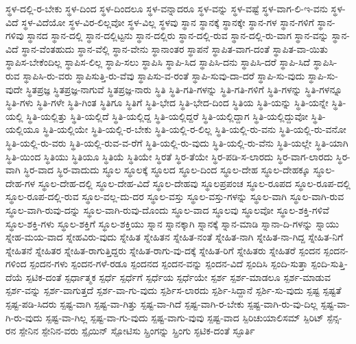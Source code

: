 {ಸ್ಥಳ-ದಲ್ಲಿ-ರ-ಬೇಕು
ಸ್ಥಳ-ದಿಂದ
ಸ್ಥಳ-ದಿಂದಲೂ
ಸ್ಥಳ-ವನ್ನಾದರೂ
ಸ್ಥಳ-ವನ್ನು
ಸ್ಥಳ-ವಷ್ಟೆ
ಸ್ಥಳ-ವಾಗ-ಲಿ-ಇ-ವನು
ಸ್ಥಳ-ವಿದೆ
ಸ್ಥಳ-ವಿದೆಯೋ
ಸ್ಥಳ-ವಿರ-ಲಿಲ್ಲವೋ
ಸ್ಥಳ-ವಿಲ್ಲ
ಸ್ಥಳವು
ಸ್ಥಾನ
ಸ್ಥಾನಕ್ಕೆ
ಸ್ಥಾನಕ್ಕೇ
ಸ್ಥಾನ-ಗಳ
ಸ್ಥಾನ-ಗಳಿಗೆ
ಸ್ಥಾನ-ಗಳಿವು
ಸ್ಥಾನದ
ಸ್ಥಾನ-ದಲ್ಲಿ
ಸ್ಥಾನ-ದಲ್ಲಿಟ್ಟನು
ಸ್ಥಾನ-ದಲ್ಲಿರು
ಸ್ಥಾನ-ದಲ್ಲಿ-ರುವ
ಸ್ಥಾನ-ದಲ್ಲಿ-ರು-ವಾಗ
ಸ್ಥಾನ-ವನ್ನು
ಸ್ಥಾನ-ವಿದೆ
ಸ್ಥಾನ-ವೆಂತಹುದು
ಸ್ಥಾನ-ವೆಲ್ಲಿ
ಸ್ಥಾನ-ವೇನು
ಸ್ಥಾನಾಂತರ
ಸ್ಥಾಪನೆ
ಸ್ಥಾಪಿತ-ವಾಗ-ದಂತೆ
ಸ್ಥಾಪಿತ-ವಾ-ಯಿತು
ಸ್ಥಾಪಿಸ-ಬೇಕೆಂದಿಲ್ಲ
ಸ್ಥಾಪಿಸ-ಲಿಲ್ಲ
ಸ್ಥಾಪಿ-ಸಲು
ಸ್ಥಾಪಿಸಿ
ಸ್ಥಾಪಿ-ಸಿದ
ಸ್ಥಾಪಿಸಿ-ದನು
ಸ್ಥಾಪಿಸಿ-ದರೆ
ಸ್ಥಾಪಿ-ಸಿದೆ
ಸ್ಥಾಪಿಸಿ-ರುವ
ಸ್ಥಾಪಿಸಿ-ರು-ವರು
ಸ್ಥಾಪಿಸುತ್ತಿ-ರು-ವೆವು
ಸ್ಥಾಪಿಸು-ವ-ರಂತೆ
ಸ್ಥಾಪಿ-ಸುವು-ದಾ-ದರೆ
ಸ್ಥಾಪಿ-ಸು-ವುದು
ಸ್ಥಾಪಿ-ಸು-ವುದೇ
ಸ್ಥಿತಪ್ರಜ್ಞ
ಸ್ಥಿತಪ್ರಜ್ಞ-ನಾಗುವೆ
ಸ್ಥಿತಪ್ರಜ್ಞ-ನಾರು
ಸ್ಥಿತಿ
ಸ್ಥಿತಿ-ಗತಿ-ಗಳನ್ನು
ಸ್ಥಿತಿ-ಗತಿ-ಗಳಿಗೆ
ಸ್ಥಿತಿ-ಗಳನ್ನು
ಸ್ಥಿತಿ-ಗಳನ್ನೂ
ಸ್ಥಿತಿ-ಗಳು
ಸ್ಥಿತಿ-ಗಳೇ
ಸ್ಥಿತಿ-ಗಿಂತ
ಸ್ಥಿತಿಗೂ
ಸ್ಥಿತಿಗೆ
ಸ್ಥಿತಿ-ಭೇದ
ಸ್ಥಿತಿ-ಭೇದ-ದಿಂದ
ಸ್ಥಿತಿಯ
ಸ್ಥಿತಿ-ಯನ್ನು
ಸ್ಥಿತಿ-ಯನ್ನೇ
ಸ್ಥಿತಿ-ಯಲ್ಲಿ
ಸ್ಥಿತಿ-ಯಲ್ಲಿತ್ತು
ಸ್ಥಿತಿ-ಯಲ್ಲಿದೆ
ಸ್ಥಿತಿ-ಯಲ್ಲಿದ್ದ
ಸ್ಥಿತಿ-ಯಲ್ಲಿದ್ದರೆ
ಸ್ಥಿತಿ-ಯಲ್ಲಿದ್ದಾಗ
ಸ್ಥಿತಿ-ಯಲ್ಲಿದ್ದುವೋ
ಸ್ಥಿತಿ-ಯಲ್ಲಿಯೂ
ಸ್ಥಿತಿ-ಯಲ್ಲಿಯೇ
ಸ್ಥಿತಿ-ಯಲ್ಲಿ-ರ-ಬೇಕು
ಸ್ಥಿತಿ-ಯಲ್ಲಿ-ರ-ಲಿಲ್ಲ
ಸ್ಥಿತಿ-ಯಲ್ಲಿ-ರು-ವನು
ಸ್ಥಿತಿ-ಯಲ್ಲಿ-ರು-ವನೋ
ಸ್ಥಿತಿ-ಯಲ್ಲಿ-ರು-ವರು
ಸ್ಥಿತಿ-ಯಲ್ಲಿ-ರುವ-ವ-ರೆಗೆ
ಸ್ಥಿತಿ-ಯಲ್ಲಿ-ರು-ವುದು
ಸ್ಥಿತಿ-ಯಲ್ಲಿ-ರು-ವೆನು
ಸ್ಥಿತಿ-ಯಲ್ಲೇ
ಸ್ಥಿತಿ-ಯಾಗಿ
ಸ್ಥಿತಿ-ಯಿಂದ
ಸ್ಥಿತಿಯು
ಸ್ಥಿತಿಯೂ
ಸ್ಥಿತಿಯೆ
ಸ್ಥಿತಿಯೇ
ಸ್ಥಿರತೆ
ಸ್ಥಿರ-ತೆಯೇ
ಸ್ಥಿರ-ಪಡಿ-ಸ-ಲಾರದು
ಸ್ಥಿರ-ವಾಗ-ಲಾರದು
ಸ್ಥಿರ-ವಾಗಿ
ಸ್ಥಿರ-ವಾದ
ಸ್ಥಿರ-ವಾದುದು
ಸ್ಥೂಲ
ಸ್ಥೂಲಕ್ಕೆ
ಸ್ಥೂಲದ
ಸ್ಥೂಲ-ದಿಂದ
ಸ್ಥೂಲ-ದೇಹ
ಸ್ಥೂಲ-ದೇಹಕ್ಕೂ
ಸ್ಥೂಲ-ದೇಹ-ಗಳ
ಸ್ಥೂಲ-ದೇಹ-ದಲ್ಲಿ
ಸ್ಥೂಲ-ದೇಹ-ವಿದೆ
ಸ್ಥೂಲ-ದೇಹವು
ಸ್ಥೂಲಪ್ರಪಂಚ
ಸ್ಥೂಲ-ರೂಪದ
ಸ್ಥೂಲ-ರೂಪ-ದಲ್ಲಿ
ಸ್ಥೂಲ-ರೂಪ-ದಲ್ಲಿ-ರುವ
ಸ್ಥೂಲ-ವಲ್ಲ-ದು-ದರ
ಸ್ಥೂಲ-ವಸ್ತು
ಸ್ಥೂಲ-ವಸ್ತು-ಗಳನ್ನು
ಸ್ಥೂಲ-ವಾಗಿ
ಸ್ಥೂಲ-ವಾಗಿ-ರುವ
ಸ್ಥೂಲ-ವಾಗಿ-ರುವು-ದನ್ನು
ಸ್ಥೂಲ-ವಾಗಿ-ರುವು-ದೊಂದು
ಸ್ಥೂಲ-ವಾದ
ಸ್ಥೂಲವು
ಸ್ಥೂಲವೋ
ಸ್ಥೂಲ-ಶಕ್ತಿ-ಗಳಿವೆ
ಸ್ಥೂಲ-ಶಕ್ತಿ-ಗಳು
ಸ್ಥೂಲ-ಶಕ್ತಿಗೆ
ಸ್ಥೂಲ-ಶಕ್ತಿಯು
ಸ್ನಾನ
ಸ್ನಾನಕ್ಕಾಗಿ
ಸ್ನಾನಕ್ಕೆ
ಸ್ನಾನ-ಮಾಡಿ
ಸ್ನಾನಾ-ದಿ-ಗಳನ್ನು
ಸ್ನಾಯು
ಸ್ನೇಹ-ಮಯ-ವಾದ
ಸ್ನೇಹವಿರು-ವುದು
ಸ್ನೇಹಿತ
ಸ್ನೇಹಿತನ
ಸ್ನೇಹಿತ-ನಂತೆ
ಸ್ನೇಹಿತ-ನಾಗಿ
ಸ್ನೇಹಿತ-ನಾ-ಗಿದ್ದ
ಸ್ನೇಹಿತ-ನಿಗೆ
ಸ್ನೇಹಿತನೆ
ಸ್ನೇಹಿತರ
ಸ್ನೇಹಿತ-ರಾಗುತ್ತಿದ್ದರು
ಸ್ನೇಹಿತ-ರಾಗು-ವು-ದಕ್ಕೆ
ಸ್ನೇಹಿತ-ರಿಗೆ
ಸ್ನೇಹಿತರು
ಸ್ನೇಹಿತರೆ
ಸ್ಪಂದನ
ಸ್ಪಂದನ-ಗಳಿಂದ
ಸ್ಪಂದನ-ಗಳು
ಸ್ಪಂದನ-ಗಳೆ-ರಡೂ
ಸ್ಪಂದನದ
ಸ್ಪಂದನ-ವನ್ನು
ಸ್ಪಂದನ-ವಿದೆ
ಸ್ಪಂದಿಸಿ
ಸ್ಪಂದಿ-ಸುತ್ತಾ
ಸ್ಪಂದಿ-ಸುತ್ತಿ-ದೆಯೆ
ಸ್ಪಟಿಕ-ದಂತೆ
ಸ್ಪರ್ಧಾತ್ಮಕ
ಸ್ಪರ್ಧೆ
ಸ್ಪರ್ಧೆಗೆ
ಸ್ಪರ್ಧೆಯ
ಸ್ಪರ್ಧೆಯೇ
ಸ್ಪರ್ಶ
ಸ್ಪರ್ಶ-ಮಾಡಲೂ
ಸ್ಪರ್ಶ-ಮಾಡುವ
ಸ್ಪರ್ಶ-ವನ್ನು
ಸ್ಪರ್ಶ-ವಾಗುತ್ತದೆ
ಸ್ಪರ್ಶ-ವಾ-ಗು-ವುದು
ಸ್ಪರ್ಶಿಸ-ಲಾರದು
ಸ್ಪರ್ಶಿ-ಸಿದ್ದಾನೆ
ಸ್ಪರ್ಶಿ-ಸು-ವುದು
ಸ್ಪಷ್ಟ
ಸ್ಪಷ್ಟತೆ
ಸ್ಪಷ್ಟ-ಪಡಿ-ಸಿದರು
ಸ್ಪಷ್ಟ-ವಾಗಿ
ಸ್ಪಷ್ಟ-ವಾ-ಗಿತ್ತು
ಸ್ಪಷ್ಟ-ವಾ-ಗಿದೆ
ಸ್ಪಷ್ಟ-ವಾಗಿ-ರ-ಬೇಕು
ಸ್ಪಷ್ಟ-ವಾಗಿ-ರು-ವು-ದಿಲ್ಲ
ಸ್ಪಷ್ಟ-ವಾ-ಗಿ-ರು-ವುದು
ಸ್ಪಷ್ಟ-ವಾ-ಗಿಲ್ಲ
ಸ್ಪಷ್ಟ-ವಾ-ಗು-ವುದು
ಸ್ಪಷ್ಟ-ವಾಗು-ವುವು
ಸ್ಪಷ್ಟ-ವಾದ
ಸ್ಪಿರಿಚುಯಾಲಿಸಮ್
ಸ್ಪಿರಿಟ್
ಸ್ಪೆನ್ಸ-ರನ
ಸ್ಪೇನಿನ
ಸ್ಪೇನಿನ-ವರು
ಸ್ಪೈಯಿನ್
ಸ್ಪೋಟಿಸು
ಸ್ಪ್ರಿಂಗನ್ನು
ಸ್ಪ್ರಿಂಗು
ಸ್ಫಟಿಕ-ದಂತೆ
ಸ್ಫೂರ್ತಿ
}
